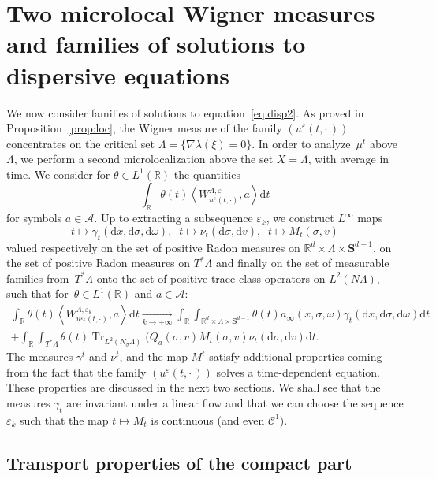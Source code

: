 \documentclass[10pt]{amsart}
\theoremstyle{definition}
\DeclareMathOperator{\Trr}{Tr}
\newcommand*\R{{\mathbb R}}
\newcommand*\eps{\varepsilon}
\numberwithin{equation}{section}
\def\Tend#1#2{\mathop{\longrightarrow}\limits_{#1\rightarrow#2}}
\newcommand*{\dd}{\mathrm{d}}
\newcommand*{\dt}{\dd t}
\newcommand*{\dx}{\dd x}
\newcommand*{\dv}{\dd v}
\newcommand*{\dsigma}{\dd \sigma}
\newcommand*{\domega}{\dd \omega}
\begin{document}
\section{Two microlocal Wigner measures and families of solutions to dispersive equations}\label{sec:4}

We now consider families of solutions to equation~\eqref{eq:disp2}. As proved in Proposition~\ref{prop:loc}, the Wigner measure of the family $(u^\eps(t,\cdot\,))$ concentrates on the critical set $\Lambda=\{\nabla\lambda(\xi)=0\}.$ In order to analyze~$\mu^t$ above $\Lambda$, we perform a second microlocalization above the set $X=\Lambda$, with average in time. We consider for $\theta\in L^1(\R)$ the quantities
\[
\int_\R \theta(t) \left\langle W^{\Lambda,\eps}_{u^\eps(t,\cdot)},a\right\rangle \dt
\]
for symbols $a\in{\mathcal A}$. Up to extracting a subsequence $\eps_k$, we construct $L^\infty$ maps
\[
t\mapsto \gamma_t(\dx,\dsigma,\domega),\;\; t\mapsto \nu_t(\dsigma,\dv),\;\; t\mapsto M_t(\sigma,v)
\]
valued respectively on the set of positive Radon measures on $\R^d\times\Lambda\times \mathbf{S}^{d-1}$, on the set of positive Radon measures on $T^*\Lambda$ and finally on the set of measurable families from~$T^*\Lambda$ onto the set of positive trace class operators on $L^2(N\Lambda)$, such that for~$\theta\in L^1(\R)$ and $a\in{\mathcal A}$:
\begin{multline*}
\int_\R \theta(t) \left\langle W^{\Lambda,\eps_k}_{u^{\eps_k}(t,\cdot)},a\right\rangle \dt\Tend{k}{+\infty}
\int_\R \int _{\R^d\times \Lambda\times \mathbf{S}^{d-1}} \theta(t)a_\infty (x,\sigma,\omega) \gamma_t(\dx,\dsigma,\domega) \dt\\
+\int_\R \int_{T^*\Lambda}\theta(t) {\Trr}_{L^2(N_\sigma\Lambda)} (Q_a(\sigma,v)M_t(\sigma,v)\nu_t(\dsigma,\dv)\dt.
\end{multline*}
The measures $\gamma^t$ and $\nu^t$, and the map $M^t$ satisfy additional properties coming from the fact that the family $(u^\eps(t,\cdot\,))$ solves a time-dependent equation. These properties are discussed in the next two sections. We shall see that the measures $\gamma_t$ are invariant under a linear flow and that we can choose the sequence $\eps_k$ such that the map $t\mapsto M_t$ is continuous (and even ${\mathcal C}^1$).



\subsection{Transport properties of the compact part}
\end{document}
